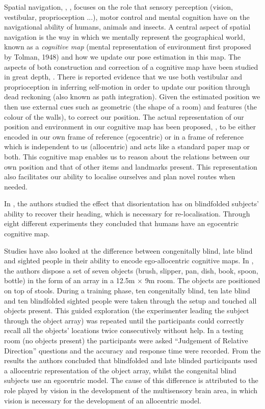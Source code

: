 Spatial navigation, \cite{Wang_2007}, \cite{what_det_our_nav_ability_2010}, focuses on the role that sensory perception 
(vision, vestibular, proprioception ...), motor control and mental cognition have on the navigational ability of  
humans, animals and insects. A central aspect of spatial navigation is the way in which we mentally represent the geographical world, known 
as a \textit{cognitive map} (mental representation of environment first proposed by Tolman, 1948) and how we update our pose estimation 
in this map. The aspects of both  construction and correction of a cognitive map have been studied in great depth, \cite{spatial_updating_2008}.
There is reported evidence that we use both vestibular and proprioception in inferring self-motion in order to update our position through dead reckoning (also known as path integration). 
Given the estimated position we then use external cues such as geometric (the shape of a room) and features (the colour of the walls), 
to correct our position. The actual representation of our position and environment in our cognitive map has been proposed,
\cite{spatial_memory_how_ego_allo_combine_2006}, to be either encoded in our own frame of reference (egocentric) or in a frame of reference which 
is independent to us (allocentric) and acts like a standard paper map or both. This cognitive map enables us to reason about the relations between our own position and that of other items and landmarks present. 
This representation also facilitates our ability to localise ourselves and plan novel routes when needed.

In \cite{updating_egocentric_human_navigation_2000}, the authors studied the effect that disorientation has on blindfolded subjects' ability 
to recover their heading, which is necessary for re-localisation. Through eight different experiments they concluded that humans 
have an egocentric cognitive map.


Studies have also looked at the difference between congenitally blind, late blind and sighted people in their ability to encode ego-allocentric cognitive maps.
In \cite{Pasqualotto2013175}, the authors dispose a set of seven objects (brush, slipper, pan, dish, book, spoon, bottle) in the form of 
an array in a 12.5m $\times$ 9m room. The objects are positioned on top of stools. During a training phase, ten congenitally blind, ten late blind and ten blindfolded sighted people were taken through 
the setup and touched all objects present. This guided exploration (the experimenter leading the subject through the object array) was repeated until 
the participants could correctly recall all the objects' locations twice consecutively without help. In a testing room (no objects present) 
the participants were asked ``Judgement of Relative Direction''  questions and the accuracy and response time were recorded. From the results the authors 
concluded that blindfolded and late blinded participants used a allocentric representation of the object array, whilst the congenital blind 
subjects use an egocentric model. The cause of this difference is attributed to the role played by vision in the development of the 
multisensory brain area, in which vision is necessary for the development of an allocentric model. 

